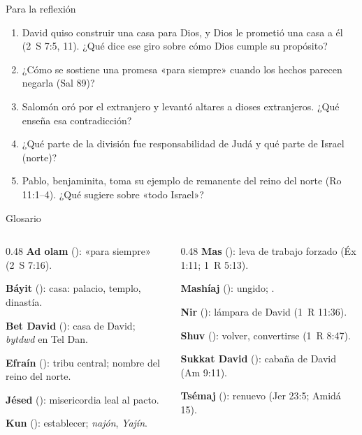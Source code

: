 \begin{frame}{Para la reflexión}
\small
\begin{enumerate}\setlength{\itemsep}{6pt}
\item David quiso construir una casa para Dios, y Dios le prometió una casa a él (2~S 7:5, 11). ¿Qué dice ese giro sobre cómo Dios cumple su propósito?
\item ¿Cómo se sostiene una promesa «para siempre» cuando los hechos parecen negarla (Sal 89)?
\item Salomón oró por el extranjero y levantó altares a dioses extranjeros. ¿Qué enseña esa contradicción?
\item ¿Qué parte de la división fue responsabilidad de Judá y qué parte de Israel (norte)?
\item Pablo, benjaminita, toma su ejemplo de remanente del reino del norte (Ro 11:1--4). ¿Qué sugiere sobre «todo Israel»?
\end{enumerate}
\end{frame}

\begin{frame}{Glosario}
\begin{columns}[T,onlytextwidth]
\begin{column}{0.48\textwidth}\small
\textbf{Ad olam} (): «para siempre» (2~S 7:16).\par\smallskip
\textbf{Báyit} (): casa: palacio, templo, dinastía.\par\smallskip
\textbf{Bet David} (): casa de David; \emph{bytdwd} en Tel Dan.\par\smallskip
\textbf{Efraín} (): tribu central; nombre del reino del norte.\par\smallskip
\textbf{Jésed} (): misericordia leal al pacto.\par\smallskip
\textbf{Kun} (): establecer; \emph{najón}, \emph{Yajín}.
\end{column}
\begin{column}{0.48\textwidth}\small
\textbf{Mas} (): leva de trabajo forzado (Éx 1:11; 1~R 5:13).\par\smallskip
\textbf{Mashíaj} (): ungido; .\par\smallskip
\textbf{Nir} (): lámpara de David (1~R 11:36).\par\smallskip
\textbf{Shuv} (): volver, convertirse (1~R 8:47).\par\smallskip
\textbf{Sukkat David} (): cabaña de David (Am 9:11).\par\smallskip
\textbf{Tsémaj} (): renuevo (Jer 23:5; Amidá 15).
\end{column}
\end{columns}
\end{frame}

